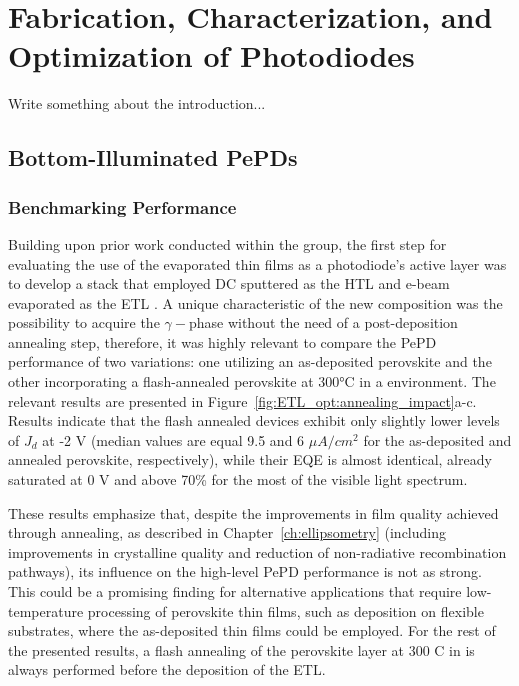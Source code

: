 \chapter{Fabrication, Characterization, and Optimization of  Photodiodes}\label{ch:transport_layer}


Write something about the introduction...

\section{Bottom-Illuminated PePDs}

\subsection{Benchmarking Performance}

Building upon prior work conducted within the group, the first step for evaluating the use of the evaporated  thin films as a photodiode's active layer was to develop a stack that employed DC sputtered  as the HTL and e-beam evaporated  as the ETL \cite{PintorMonroy2021All-EvaporatedApplications}. A unique characteristic of the new composition was the possibility to acquire the $\gamma-$phase without the need of a post-deposition annealing step, therefore, it was highly relevant to compare the PePD performance of two variations: one utilizing an as-deposited perovskite and the other incorporating a flash-annealed perovskite at 300°C in a  environment. The relevant results are presented in Figure~\ref{fig:ETL_opt:annealing_impact}a-c. Results indicate that the flash annealed devices exhibit only slightly lower levels of $J_d$ at -2 V (median values are equal 9.5 and 6 $\mu A/cm^2$ for the as-deposited and annealed perovskite, respectively), while their EQE is almost identical, already saturated at 0 V and above 70\% for the most of the visible light spectrum. 

These results emphasize that, despite the improvements in film quality achieved through annealing, as described in Chapter~\ref{ch:ellipsometry} (including improvements in crystalline quality and reduction of non-radiative recombination pathways), its influence on the high-level PePD performance is not as strong. This could be a promising finding for alternative applications that require low-temperature processing of perovskite thin films, such as deposition on flexible substrates, where the as-deposited  thin films could be employed. For the rest of the presented results, a flash annealing of the perovskite layer at 300 \degree C in  is always performed before the deposition of the ETL. 

